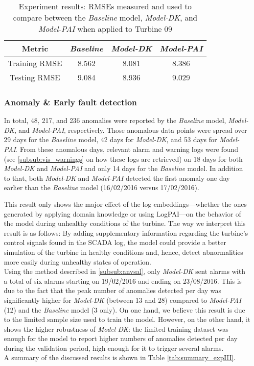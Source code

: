\begin{table}[H]
    \centering
\begin{tabular}{|c|c|c|c|}
\hline
     \textbf{Metric} & \textbf{\emph{Baseline}} & \textbf{\emph{Model-DK}} & \textbf{\emph{Model-PAI}}\\
     \hline
     Training RMSE & 8.562 & 8.081 & 8.386\\
     \hline
     Testing RMSE & 9.084 & 8.936 & 9.029\\
\hline
\end{tabular}
\caption{Experiment results: RMSEs measured and used to compare between the \emph{Baseline} model, \emph{Model-DK}, and \emph{Model-PAI} when applied to Turbine 09}
    \label{tab:Experiment III results}
\end{table}

\subsubsection{Anomaly \& Early fault detection}
In total, 48, 217, and 236 anomalies were reported by the \emph{Baseline} model, \emph{Model-DK}, and \emph{Model-PAI}, respectively.
Those anomalous data points were spread over 29 days for the \emph{Baseline} model, 42 days for \emph{Model-DK}, and 53 days for \emph{Model-PAI}.
From these anomalous days, relevant alarm and warning logs were found (see \ref{subsub:vis_warnings} on how these logs are retrieved) on 18 days for both \emph{Model-DK} and \emph{Model-PAI} and only 14 days for the \emph{Baseline} model.
In addition to that, both \emph{Model-DK} and \emph{Model-PAI} detected the first anomaly one day earlier than the \emph{Baseline} model (16/02/2016 versus 17/02/2016).

This result only shows the major effect of the log embeddings---whether the ones generated by applying domain knowledge or using LogPAI---on the behavior of 
the model during unhealthy conditions of the turbine. The way we interpret this result is as follows: By adding supplementary information regarding the turbine's control signals
found in the SCADA log, the model could provide a better simulation of the turbine in healthy conditions and, hence, detect abnormalities more easily
during unhealthy states of operation.\\
Using the method described in \ref{subsub:anvsal}, only \emph{Model-DK} sent alarms with a total of six alarms starting on 19/02/2016 and ending on 23/08/2016.
This is due to the fact that the peak number of anomalies detected per day was significantly higher for \emph{Model-DK} (between 13 and 28) 
compared to \emph{Model-PAI} (12) and the \emph{Baseline} model (3 only). 
On one hand, we believe this result is due to the limited sample size used to train the model. 
However, on the other hand, it shows the higher robustness of \emph{Model-DK}: the limited training dataset was enough for the model 
to report higher numbers of anomalies detected per day during the validation period, high enough for it to trigger several alarms.\\
A summary of the discussed results is shown in Table \ref{tab:summary_expIII}.

